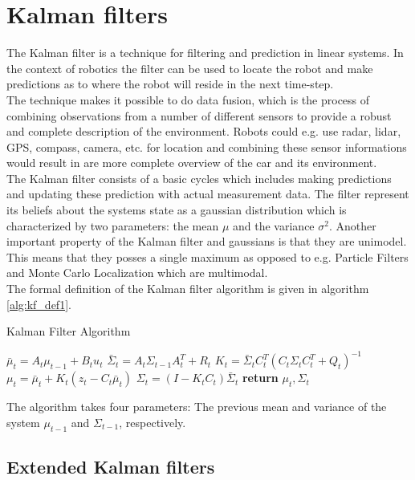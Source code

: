 
\section{Kalman filters}

The Kalman filter is a technique for filtering and prediction in linear systems. In the context of robotics the filter can be used to locate the robot and make predictions as to where the robot will reside in the next time-step.\\

The technique makes it possible to do data fusion, which is the process of combining observations from a number of different sensors to provide a robust and complete description of the environment. Robots could e.g. use radar, lidar, GPS, compass, camera, etc. for location and combining these sensor informations would result in are more complete overview of the car and its environment.\\

The Kalman filter consists of a basic cycles which includes making predictions and updating these prediction with actual measurement data. The filter represent its beliefs about the systems state as a gaussian distribution which is characterized by two parameters: the mean $\mu$ and the variance $\sigma^2$. Another important property of the Kalman filter and gaussians is that they are unimodel. This means that they posses a single maximum as opposed to e.g. Particle Filters and Monte Carlo Localization which are multimodal.\\

The formal definition of the Kalman filter algorithm is given in algorithm \ref{alg:kf_def1}.

\begin{center}
\begin{minipage}{.65\linewidth}
\begin{algorithm}[H]
\caption{Kalman Filter Algorithm}
\label{alg:kf_def1}
\begin{algorithmic}[1]
   \State $\bar\mu_{t} = A_{t}\mu_{t-1} + B_{t}u_{t}$%
   \State $\bar\Sigma_{t} = A_{t}\Sigma_{t-1}A_{t}^T + R_{t}$
   \State $K_{t} = \bar\Sigma_{t}C_{t}^T(C_{t}\Sigma_{t}C_{t}^T+Q_{t})^{-1}$
   \State $\mu_{t} = \bar\mu_{t} + K_{t}(z_{t} - C_{t}\bar\mu_{t})$
   \State $\Sigma_{t} = (I - K_{t}C_{t})\bar\Sigma_{t}$
   \State \textbf{return} $\mu_{t}, \Sigma_{t}$
\EndProcedure
\end{algorithmic}
\end{algorithm}
\end{minipage}
\end{center}

The algorithm takes four parameters: The previous mean and variance of the system $\mu_{t-1}$ and $\Sigma_{t-1}$, respectively.

\subsection{Extended Kalman filters}